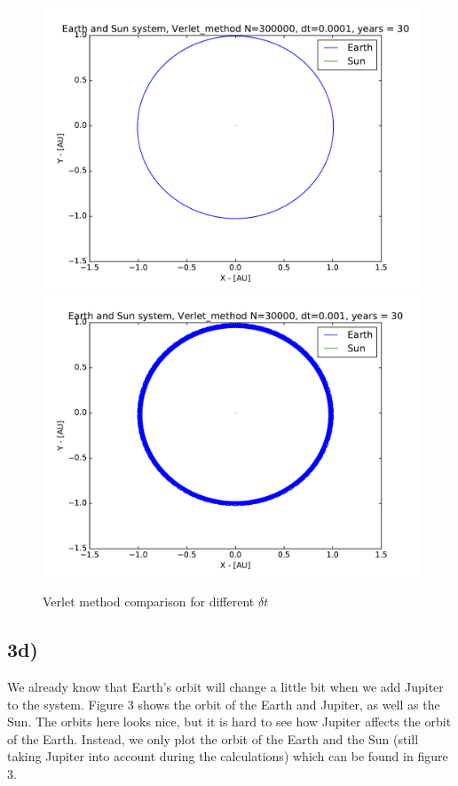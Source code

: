 \documentclass[12pt]{article}
\begin{document}
\begin{figure}[hbtp]
\centering
\includegraphics[width=\linewidth]{Plots/Earth_Sun_Verlet_method.pdf}
\includegraphics[width=\linewidth]{Plots/Earth_Sun_Verlet_method_larger_dt.pdf}
\caption{Verlet method comparison for different $\delta t$}
\end{figure}

\newpage

\subsection*{3d)}
We already know that Earth's orbit will change a little bit when we add Jupiter to the system. Figure 3 shows the orbit of the Earth and Jupiter, as well as the Sun. The orbits here looks nice, but it is hard to see how Jupiter affects the orbit of the Earth. Instead, we only plot the orbit of the Earth and the Sun (still taking Jupiter into account during the calculations) which can be found in figure 3. 
\end{document}
